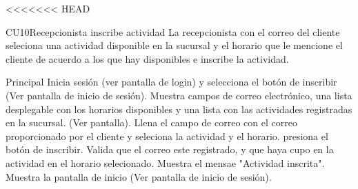 

<<<<<<< HEAD
	\begin{UseCase}{CU10}{Recepcionista inscribe actividad}{
		La recepcionista con el correo del cliente seleciona una actividad disponible en la sucursal y el horario que le mencione el cliente de acuerdo a los que hay disponibles e inscribe la actividad.
	}
	\end{UseCase}
	\begin{UCtrayectoria}{Principal}
		\UCpaso[\UCactor] Inicia sesión (ver pantalla de login) y selecciona el botón de inscribir (Ver pantalla de inicio de sesión).
		\UCpaso Muestra campos de correo electrónico, una lista desplegable con los horarios disponibles y una lista con las actividades registradas en la sucursal. (Ver pantalla).
		\UCpaso[\UCactor] Llena el campo de correo con el correo proporcionado por el cliente y seleciona la actividad y el horario.
		\UCpaso[\UCactor] presiona el botón de inscribir.
		\UCpaso Valida que el correo este registrado, y que haya cupo en la actividad en el horario selecionado.			\UCpaso Muestra el mensae "Actividad inscrita".
		\UCpaso Muestra la pantalla de inicio (Ver pantalla de inicio de sesión).
	\end{UCtrayectoria}


